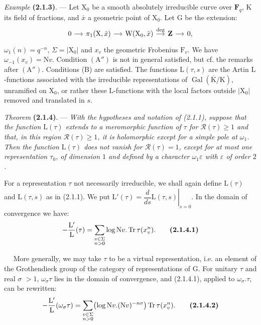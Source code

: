 \documentclass[11pt,leqno]{article}
\newcommand{\Page}[1]{\ifvmode\noindent\else\unskip\ \fi{\footnotesize\textcolor{gray}{[p.\,#1]}}\ \ignorespaces}
\begin{document}
\textit{Example} \textbf{(2.1.3)}. — Let \(\mathrm{X}_0\) be a smooth absolutely irreducible curve over \(\mathbf{F}_q\), \(\mathrm{K}\) its field of fractions, and \(\bar{x}\) a geometric point of \(\mathrm{X}_0\). Let \(\mathrm{G}\) be the extension:
\[
\begin{tikzcd}[column sep=1.2em]
0 \arrow[r]
  & \pi_1(\mathrm{X},\bar{x}) \arrow[r]
  & \mathrm{W}(\mathrm{X}_0,\bar{x}) \arrow[r,"\deg"]
  & \mathbf{Z} \arrow[r]
  & 0,
\end{tikzcd}
\]
\(\omega_1(n)=q^{-n}\), \(\Sigma=|\mathrm{X}_0|\) and \(x_v\) the geometric Frobenius \(\mathrm{F}_v\). We have \(\omega_{-1}(x_v)=\mathrm{N}v\). Condition \((\mathrm{A}'')\) is not in general satisfied, but cf. the remarks after \((\mathrm{A}'')\). Conditions (B) are satisfied. The functions \(\mathrm{L}(\tau,s)\) are the Artin \(\mathrm{L}\)-functions associated with the irreducible representations of \(\operatorname{Gal}(\overline{\mathrm{K}}/\mathrm{K})\), unramified on \(\mathrm{X}_0\), or rather these \(\mathrm{L}\)-functions with the local factors outside \(|\mathrm{X}_0|\) removed and translated in \(s\).

\textit{Theorem} \textbf{(2.1.4)}. — \textit{With the hypotheses and notation of \textup{(2.1.1)}, suppose that the function \(\mathrm{L}(\tau)\) extends to a meromorphic function of \(\tau\) for \(\mathscr{R}(\tau)\geq1\) and that, in this region \(\mathscr{R}(\tau)\geq1\), it is holomorphic except for a simple pole at \(\omega_1\). Then the function \(\mathrm{L}(\tau)\) does not vanish for \(\mathscr{R}(\tau)=1\), except for at most one representation \(\tau_0\), of dimension \(1\) and defined by a character \(\omega_1\varepsilon\) with \(\varepsilon\) of order \(2\).}

For a representation \(\tau\) not necessarily irreducible, we shall again define \(\mathrm{L}(\tau)\) and \(\mathrm{L}(\tau,s)\) as in (2.1.1). We put \(\mathrm{L}'(\tau)=\left.\dfrac{d}{ds}\mathrm{L}(\tau,s)\right|_{s=0}\). In the domain of convergence we have:
\[
-\frac{\mathrm{L}'}{\mathrm{L}}(\tau)
 =\sum_{\substack{v\in\Sigma\\ n>0}}
   \log\mathrm{N}v.\operatorname{Tr}\tau(x_v^n).
\tag*{\textbf{(2.1.4.1)}}
\]

\Page{189}
More generally, we may take \(\tau\) to be a virtual representation, i.e. an element of the Grothendieck group of the category of representations of \(\mathrm{G}\). For unitary \(\tau\) and real \(\sigma\) \(>1\), \(\omega_\sigma\tau\) lies in the domain of convergence, and (2.1.4.1), applied to \(\omega_\sigma.\tau\), can be rewritten:
\[
-\frac{\mathrm{L}'}{\mathrm{L}}(\omega_\sigma\tau)
 =\sum_{\substack{v\in\Sigma\\ n>0}}
   \bigl(\log\mathrm{N}v.(\mathrm{N}v)^{-n\sigma}\bigr)
   \operatorname{Tr}\tau(x_v^n).
\tag*{\textbf{(2.1.4.2)}}
\]
\end{document}

